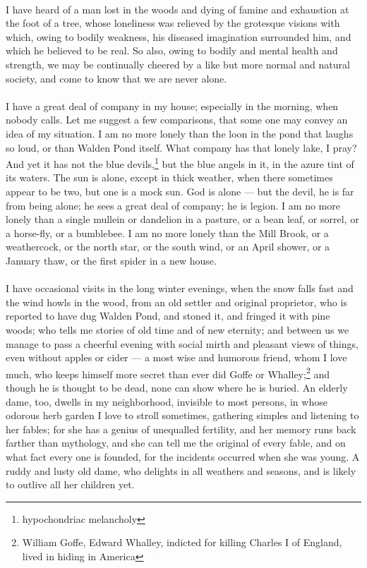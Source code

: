 \documentclass[letterpaper,12pt]{article}
\begin{document}
\paragraph{}
I have heard of a man lost in the woods and dying of famine and exhaustion at
the foot of a tree, whose loneliness was relieved by the grotesque visions with
which, owing to bodily weakness, his diseased imagination surrounded him, and
which he believed to be real. So also, owing to bodily and mental health and
strength, we may be continually cheered by a like but more normal and natural
society, and come to know that we are never alone.

\paragraph{}
I have a great deal of company in my house; especially in the morning, when
nobody calls. Let me suggest a few comparisons, that some one may convey an idea
of my situation. I am no more lonely than the loon in the pond that laughs so
loud, or than Walden Pond itself. What company has that lonely lake, I pray? And
yet it has not the blue devils,\footnote{hypochondriac melancholy} but the blue
angels in it, in the azure tint of its waters. The sun is alone, except in thick
weather, when there sometimes appear to be two, but one is a mock sun. God is
alone --- but the devil, he is far from being alone; he sees a great deal of
company; he is legion. I am no more lonely than a single mullein or dandelion in
a pasture, or a bean leaf, or sorrel, or a horse-fly, or a bumblebee. I am no
more lonely than the Mill Brook, or a weathercock, or the north star, or the
south wind, or an April shower, or a January thaw, or the first spider in a new
house.

\paragraph{}
I have occasional visits in the long winter evenings, when the snow falls fast
and the wind howls in the wood, from an old settler and original proprietor, who
is reported to have dug Walden Pond, and stoned it, and fringed it with pine
woods; who tells me stories of old time and of new eternity; and between us we
manage to pass a cheerful evening with social mirth and pleasant views of
things, even without apples or cider --- a most wise and humorous friend, whom I
love much, who keeps himself more secret than ever did Goffe or
Whalley;\footnote{William Goffe, Edward Whalley, indicted for killing Charles I
    of England, lived in hiding in America} and though he is thought to be dead,
none can show where he is buried. An elderly dame, too, dwells in my
neighborhood, invisible to most persons, in whose odorous herb garden I love to
stroll sometimes, gathering simples and listening to her fables; for she has a
genius of unequalled fertility, and her memory runs back farther than mythology,
and she can tell me the original of every fable, and on what fact every one is
founded, for the incidents occurred when she was young. A ruddy and lusty old
dame, who delights in all weathers and seasons, and is likely to outlive all her
children yet.
\end{document}
